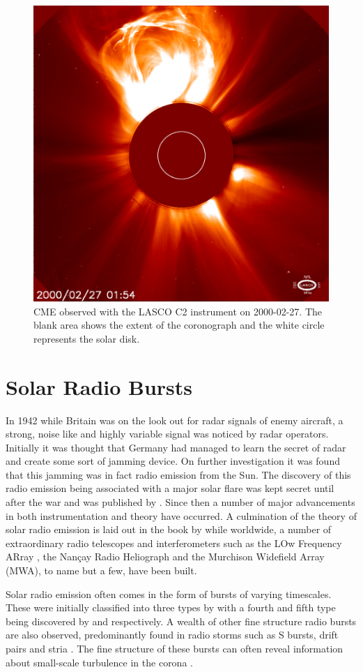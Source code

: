 \begin{figure}
    \centering
    \includegraphics[width=0.5\columnwidth]{Images/LASCO_C2_CME.jpg}
    \caption[CME observed with the LASCO C2 instrument on 2000-02-27.]{CME observed with the LASCO C2 instrument on 2000-02-27. The blank area shows the extent of the coronograph and the white circle represents the solar disk.}
    \label{fig:CME}
\end{figure}

\section{Solar Radio Bursts}
In 1942 while Britain was on the look out for radar signals of enemy aircraft, a strong, noise like and highly variable signal was noticed by radar operators. Initially it was thought that Germany had managed to learn the secret of radar and create some sort of jamming device. On further investigation it was found that this jamming was in fact radio emission from the Sun. The discovery of this radio emission being associated with a major solar flare was kept secret until after the war and was published by \cite{Appleton1946}.
Since then a number of major advancements in both instrumentation and theory have occurred. A culmination of the theory of solar radio emission is laid out in the book by \cite{McLean1985} while worldwide, a number of extraordinary radio telescopes and interferometers such as the LOw Frequency ARray \cite[LOFAR,][]{VanHaarlem2013}, the Nan\c{c}ay Radio Heliograph and the Murchison Widefield Array (MWA), to name but a few, have been built.

Solar radio emission often comes in the form of bursts of varying timescales. These were initially classified into three types by \cite{Wild1950b} with a fourth and fifth type being discovered by \cite{Boischot1957} and \cite{Wild1959} respectively. A wealth of other fine structure radio bursts are also observed, predominantly found in radio storms such as S bursts, drift pairs and stria \citep{McConnell1980,Melrose1982,NelsonandMelrose1985}. 
The fine structure of these bursts can often reveal information about small-scale turbulence in the corona \citep{Kontar2017}.

